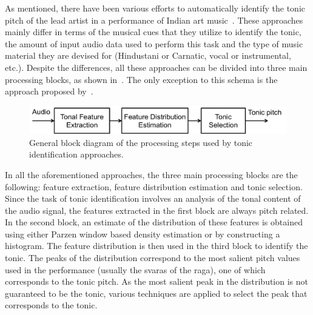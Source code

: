 As mentioned, there have been various efforts to automatically identify the tonic pitch of the lead artist in a performance of Indian art music~\citep{salamon2012multipitch,gulati2012two,bellur2012knowledge,ranjani2011carnatic,Sengupta2005b}. These approaches mainly differ in terms of the musical cues that they utilize to identify the tonic, the amount of input audio data used to perform this task and the type of music material they are devised for (Hindustani or Carnatic, vocal or
instrumental, etc.). Despite the differences, all these approaches can be divided into three main processing blocks, as shown in~. The only exception to this schema is the approach proposed by~\cite{Sengupta2005b}.

\begin{figure}
	\begin{center}
		\includegraphics[width=\figSizeNinety]{ch02_background/figures/tonic_identification_block_diagram.pdf}
	\end{center}
	\caption[General block diagram of the processing steps used by tonic identification
	approaches.]{General block diagram of the processing steps used by tonic identification
		approaches.}
	\label{fig:tonic_identification_general_block_diagram}
\end{figure}


In all the aforementioned approaches, the three main processing blocks are the following: feature extraction, feature distribution estimation and tonic selection. Since the task of tonic identification involves an analysis of the tonal content of the audio signal, the features extracted in the first block are always pitch related. In the second block, an estimate of the distribution of these features is obtained using either Parzen window based density estimation or by constructing a histogram. The feature distribution is then used in the third block to identify the tonic. The peaks of the distribution correspond to the most salient pitch values used in the performance (usually the \glspl{svara} of the \gls{raga}), one of which corresponds to the tonic pitch. As the most salient peak in the distribution is not guaranteed to be the tonic, various techniques are applied to select the peak that corresponds to the tonic.

